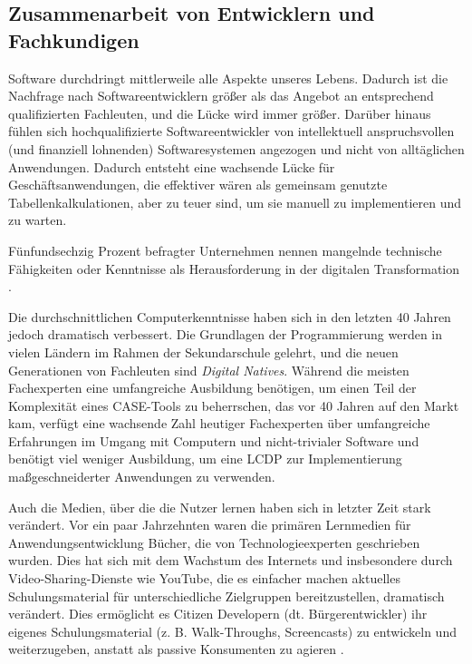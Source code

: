 \documentclass[12pt]{article} %
\begin{document}
	\subsection{Zusammenarbeit von Entwicklern und Fachkundigen}		
	Software durchdringt mittlerweile alle Aspekte unseres Lebens. Dadurch ist die Nachfrage nach Softwareentwicklern größer als das Angebot an entsprechend qualifizierten Fachleuten, und die Lücke wird immer größer. Darüber hinaus fühlen sich hochqualifizierte Softwareentwickler von intellektuell anspruchsvollen (und finanziell lohnenden) Softwaresystemen angezogen und nicht von alltäglichen Anwendungen. Dadurch entsteht eine wachsende Lücke für Geschäftsanwendungen, die effektiver wären als gemeinsam genutzte Tabellenkalkulationen, aber zu teuer sind, um sie manuell zu implementieren und zu warten. %

	Fünfundsechzig Prozent befragter Unternehmen nennen mangelnde technische Fähigkeiten oder Kenntnisse als Herausforderung in der digitalen Transformation \cite{EmmaVanPelt.2019}. \newline %
	
	Die durchschnittlichen Computerkenntnisse haben sich in den letzten 40 Jahren jedoch dramatisch verbessert. Die Grundlagen der Programmierung werden in vielen Ländern im Rahmen der Sekundarschule gelehrt, und die neuen Generationen von Fachleuten sind \emph{Digital Natives}. Während die meisten Fachexperten eine umfangreiche Ausbildung benötigen, um einen Teil der Komplexität eines CASE-Tools zu beherrschen, das vor 40 Jahren auf den Markt kam, verfügt eine wachsende Zahl heutiger Fachexperten über umfangreiche Erfahrungen im Umgang mit Computern und nicht-trivialer Software und benötigt viel weniger Ausbildung, um eine LCDP zur Implementierung maßgeschneiderter Anwendungen zu verwenden\cite{DiRuscio.2022}. \newline
	
	Auch die Medien, über die die Nutzer lernen haben sich in letzter Zeit stark verändert. Vor ein paar Jahrzehnten waren die primären Lernmedien für Anwendungsentwicklung Bücher, die von Technologieexperten geschrieben wurden. Dies hat sich mit dem Wachstum des Internets und insbesondere durch Video-Sharing-Dienste wie YouTube, die es einfacher machen aktuelles Schulungsmaterial für unterschiedliche Zielgruppen bereitzustellen, dramatisch verändert.
	Dies ermöglicht es Citizen Developern (dt. Bürgerentwickler) ihr eigenes Schulungsmaterial (z. B. Walk-Throughs, Screencasts) zu entwickeln und weiterzugeben, anstatt als passive Konsumenten zu agieren \cite{DiRuscio.2022}.
	
\end{document}
